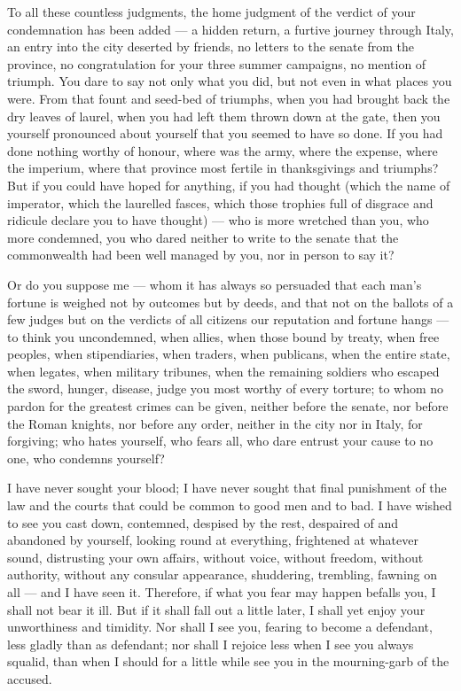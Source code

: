  To all these countless judgments, the home judgment of the verdict of your condemnation has been added — a hidden return, a furtive journey through Italy, an entry into the city deserted by friends, no letters to the senate from the province, no congratulation for your three summer campaigns, no mention of triumph. You dare to say not only what you did, but not even in what places you were. From that fount and seed-bed of triumphs, when you had brought back the dry leaves of laurel, when you had left them thrown down at the gate, then you yourself pronounced about yourself that you seemed to have so done. If you had done nothing worthy of honour, where was the army, where the expense, where the imperium, where that province most fertile in thanksgivings and triumphs? But if you could have hoped for anything, if you had thought (which the name of imperator, which the laurelled fasces, which those trophies full of disgrace and ridicule declare you to have thought) — who is more wretched than you, who more condemned, you who dared neither to write to the senate that the commonwealth had been well managed by you, nor in person to say it?

 Or do you suppose me — whom it has always so persuaded that each man's fortune is weighed not by outcomes but by deeds, and that not on the ballots of a few judges but on the verdicts of all citizens our reputation and fortune hangs — to think you uncondemned, when allies, when those bound by treaty, when free peoples, when stipendiaries, when traders, when publicans, when the entire state, when legates, when military tribunes, when the remaining soldiers who escaped the sword, hunger, disease, judge you most worthy of every torture; to whom no pardon for the greatest crimes can be given, neither before the senate, nor before the Roman knights, nor before any order, neither in the city nor in Italy, for forgiving; who hates yourself, who fears all, who dare entrust your cause to no one, who condemns yourself?

 I have never sought your blood; I have never sought that final punishment of the law and the courts that could be common to good men and to bad. I have wished to see you cast down, contemned, despised by the rest, despaired of and abandoned by yourself, looking round at everything, frightened at whatever sound, distrusting your own affairs, without voice, without freedom, without authority, without any consular appearance, shuddering, trembling, fawning on all — and I have seen it. Therefore, if what you fear may happen befalls you, I shall not bear it ill. But if it shall fall out a little later, I shall yet enjoy your unworthiness and timidity. Nor shall I see you, fearing to become a defendant, less gladly than as defendant; nor shall I rejoice less when I see you always squalid, than when I should for a little while see you in the mourning-garb of the accused.

